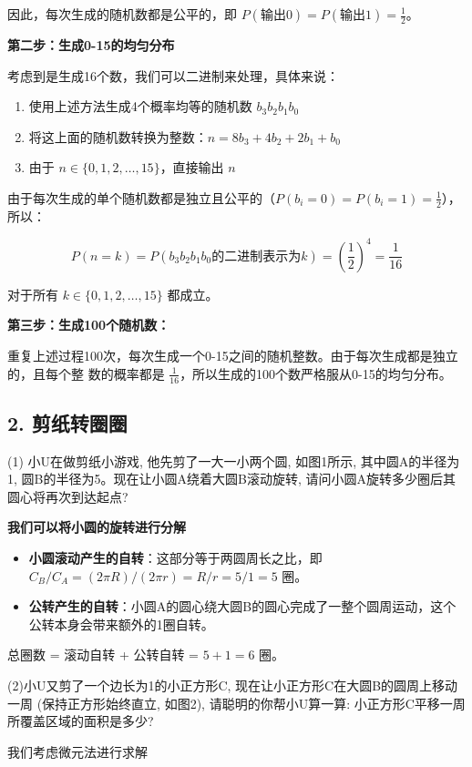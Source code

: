 \documentclass[UTF8]{ctexart}
\begin{document}
因此，每次生成的随机数都是公平的，即 $P(\text{输出0}) = P(\text{输出1}) =
\frac{1}{2}$。

\textbf{第二步：生成0-15的均匀分布}

考虑到是生成16个数，我们可以二进制来处理，具体来说：
\begin{enumerate}
    \item 使用上述方法生成4个概率均等的随机数 $b_3b_2b_1b_0$
    \item 将这上面的随机数转换为整数：$n = 8b_3 + 4b_2 + 2b_1 + b_0$
    \item 由于 $n \in \{0,1,2,\ldots,15\}$，直接输出 $n$
\end{enumerate}


由于每次生成的单个随机数都是独立且公平的（$P(b_i = 0) = P(b_i = 1) = \frac{1}{2}$），所以：

$$P(n = k) = P(b_3b_2b_1b_0 \text{的二进制表示为} k) = \left(\frac{1}{2}\right)^4 =
\frac{1}{16}$$

对于所有 $k \in \{0,1,2,\ldots,15\}$ 都成立。

\textbf{第三步：生成100个随机数：}

重复上述过程100次，每次生成一个0-15之间的随机整数。由于每次生成都是独立的，且每个整
数的概率都是 $\frac{1}{16}$，所以生成的100个数严格服从0-15的均匀分布。

\subsection*{2. 剪纸转圈圈}

(1) 小U在做剪纸小游戏, 他先剪了一大一小两个圆, 如图1所示, 其中圆A的半径为1, 圆B的半径为5。现在让小圆A绕着大圆B滚动旋转, 请问小圆A旋转多少圈后其圆心将再次到达起点?

\textbf{我们可以将小圆的旋转进行分解}
\begin{itemize}
    \item \textbf{小圆滚动产生的自转}：这部分等于两圆周长之比，即 $C_B / C_A = (2\pi R)/(2\pi r) = R/r = 5/1 = 5$ 圈。 
    \item \textbf{公转产生的自转}：小圆A的圆心绕大圆B的圆心完成了一整个圆周运动，这个公转本身会带来额外的1圈自转。
\end{itemize}
总圈数 = 滚动自转 + 公转自转 = $5 + 1 = 6$ 圈。

(2)小U又剪了一个边长为1的小正方形C, 现在让小正方形C在大圆B的圆周上移动一周 (保持正方形始终直立, 如图2), 请聪明的你帮小U算一算: 小正方形C平移一周所覆盖区域的面积是多少?

我们考虑微元法进行求解
\end{document}
